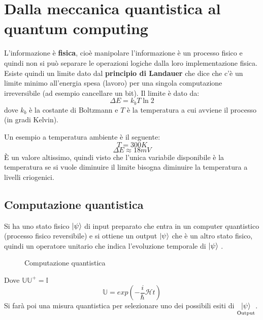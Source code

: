 \documentclass[a4paper]{article}
\begin{document}
\section{Dalla meccanica quantistica al quantum computing}
L'informazione è \textbf{fisica}, cioè manipolare l'informazione è un processo fisico e
quindi non si può separare le operazioni logiche dalla loro implementazione fisica.
Esiste quindi un limite dato dal \textbf{principio di Landauer} che dice che c'è un limite
minimo all'energia spesa (lavoro) per una singola computazione irreversibile (ad esempio
cancellare un bit). Il limite è dato da:
\[
  \Delta E = k_bT \ln 2
\] 
dove \( k_b \) è la costante di Boltzmann e \( T \) è la temperatura a cui avviene il 
processo (in gradi Kelvin).

\begin{example}
  Un esempio a temperatura ambiente è il seguente:
  \[
    T = 300 K
  \] 
  \[
    \Delta E \approx 18 mV
  \] 
  È un valore altissimo, quindi visto che l'unica variabile disponibile è la temperatura
  se si vuole diminuire il limite bisogna diminuire la temperatura a livelli criogenici.
\end{example}

\subsection{Computazione quantistica}
Si ha uno stato fisico \( \ket{\psi } \) di input preparato che entra in un computer
quantistico (processo fisico reversibile) e si ottiene un output \( \ket{\psi } \) che è un altro
stato fisico, quindi un operatore unitario che indica l'evoluzione temporale di \( \ket{\psi } \) .
\begin{figure}[H]
  \centering
  \caption{Computazione quantistica}
\end{figure}
\noindent
Dove \( \mathbb{U} \mathbb{U}^+ = \mathbb{I} \) 
\[
  \mathbb{U} = exp \left( -\frac{i}{\hslash} \mathcal{H} t \right)
\] 
Si farà poi una misura quantistica per selezionare uno dei possibili esiti di
\( \underset{\text{Output}}{\ket{\psi }} \).
\end{document}
